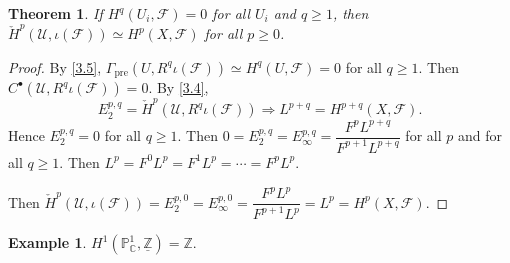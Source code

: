 \documentclass{amsart}
\numberwithin{equation}{section}
\theoremstyle{plain}
\newtheorem{thm}[equation]{Theorem}
\theoremstyle{definition}
\newtheorem{eg}[equation]{Example}
\DeclareMathOperator{\Pre}{pre}
\begin{document}
\begin{thm}\label{3.11}
	If $ H^q(U_i, \mathscr F)=0 $ for all $ U_i $ and $ q\ge 1 $, then $ \check{H}^p(\mathscr U, \iota(\mathscr F))\simeq H^p(X, \mathscr F)$ for all $ p\ge 0 $. 
\end{thm}


\begin{proof}
	By \cref{3.5}, $ \Gamma_{\Pre}(U, R^q\iota (\mathscr F))\simeq H^q(U, \mathscr F) =0$ for all $ q\ge 1 $. 
	Then $ C^{\bullet}(\mathscr U, R^q\iota (\mathscr F))=0 $.
	By \cref{3.4}, $$E_2^{p,q}=\check{H}^p(\mathscr U, R^q\iota (\mathscr F))\Rightarrow L^{p+q}=H^{p+q}(X, \mathscr F).$$ 
	Hence $ E_2^{p,q}=0 $ for all $ q\ge 1 $. 
	Then $ 0=E_2^{p,q}=E_{\infty}^{p,q}=\dfrac{F^pL^{p+q}}{F^{p+1}L^{p+q}} $ for all $ p $ and for all $ q\ge 1 $. Then $ L^p=F^0L^p=F^1L^p=\cdots=F^pL^p $. 
	
	Then $ \check{H}^p(\mathscr U, \iota(\mathscr F))=E_2^{p,0}=E_{\infty}^{p,0}=\dfrac{F^pL^p}{F^{p+1}L^p}=L^p=H^p(X,\mathscr F) $. 
\end{proof}

\begin{eg}
	$ H^1(\mathbb P^1_{\mathbb C}, \underline{\mathbb Z})= \mathbb Z$. 
\end{eg}
\end{document}
